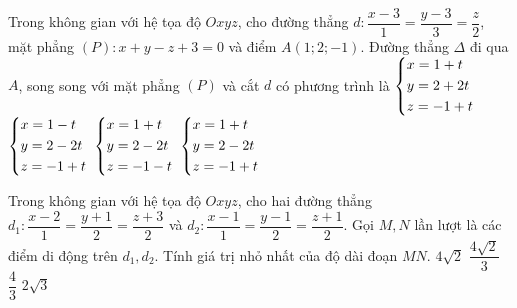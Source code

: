 \begin{ex}%
	Trong không gian với hệ tọa độ $Oxyz$, cho đường thẳng $d\colon \dfrac{x - 3}{1}=\dfrac{y - 3}{3}=\dfrac{z}{2}$, mặt phẳng $(P)\colon x + y - z + 3=0$ và điểm $A\left(1; 2; - 1\right)$. Đường thẳng $\Delta $ đi qua $A$, song song với mặt phẳng $(P)$ và cắt $d$ có phương trình là 
	\choice
	{$\left\{\begin{aligned} & x=1 + t \\ & y=2 + 2t \\ & z= - 1 + t \end{aligned}\right. $}
	{$\left\{\begin{aligned} & x=1 - t \\ & y=2 - 2t \\ & z= - 1 + t \end{aligned}\right. $}
	{\True $\left\{\begin{aligned} & x=1 + t \\ & y=2 - 2t \\ & z= - 1 - t \end{aligned}\right. $}
	{$\left\{\begin{aligned} & x=1 + t \\ & y=2 - 2t \\ & z= - 1 + t \end{aligned}\right. $}
\end{ex}

\begin{ex}%
	Trong không gian với hệ tọa độ $Oxyz$, cho hai đường thẳng $d_1\colon \dfrac{x - 2}{1}=\dfrac{y + 1}{2}=\dfrac{z + 3}{2}$ và $d_2\colon \dfrac{x - 1}{1}=\dfrac{y - 1}{2}=\dfrac{z + 1}{2}$. Gọi $M, N$ lần lượt là các điểm di động trên $d_1, d_2$. Tính giá trị nhỏ nhất của độ dài đoạn $MN$. 
	\choice
	{$4\sqrt{2}$}
	{\True $\dfrac{4\sqrt{2}}{3}$}
	{$\dfrac{4}{3}$}
	{$2\sqrt{3}$}
\end{ex}

